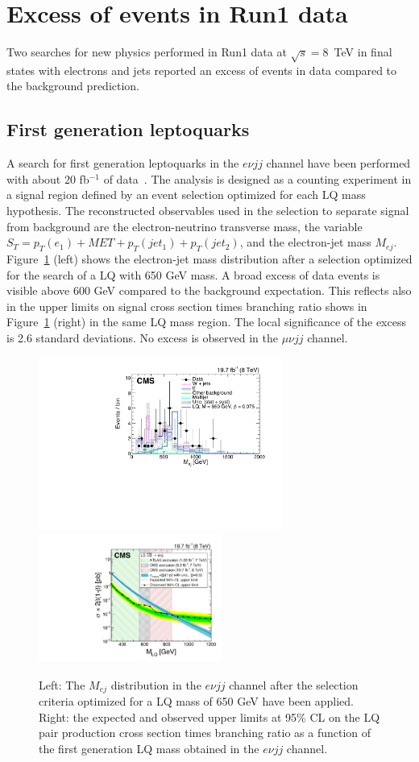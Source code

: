 \documentclass[epj]{webofc}
\begin{document}
\section{Excess of events in Run1 data}
\label{excess}

Two searches for new physics performed in Run1 data at $\sqrt{s}=8$~TeV
in final states with electrons and jets reported an excess of events
in data compared to the background prediction.

\subsection{First generation leptoquarks}

A search for first generation leptoquarks in the $e\nu jj$ channel
have been performed with about 20 fb$^{-1}$ of data~\cite{Khachatryan:2015vaa}. The analysis is
designed as a counting experiment in a signal region defined by an
event selection optimized for each LQ mass hypothesis. The
reconstructed observables used in the selection to separate signal from background
are the electron-neutrino transverse mass, the variable $S_{T}=p_T(e_1)+MET+p_T(jet_1)+p_T(jet_2)$, 
and the electron-jet mass $M_{ej}$. Figure~\ref{LQ1} (left) shows the 
electron-jet mass distribution after a selection optimized for the
search of a LQ with 650 GeV mass. A broad excess of data events is visible 
above 600 GeV compared to the background expectation. This reflects also in the
upper limits on signal cross section times branching ratio shows in
Figure~\ref{LQ1} (right) in the same LQ mass region. The local significance of
the excess is 2.6 standard deviations. No excess is observed in the
$\mu\nu jj$ channel.
%
\begin{figure}[h]
\centering
\includegraphics[width=8cm,clip]{CMS-EXO-12-041_Figure_009-b.pdf}
\includegraphics[width=6cm,clip]{CMS-EXO-12-041_Figure_010-b.pdf}
\caption{Left: The $M_{ej}$ distribution in the $e\nu jj$ channel after the
  selection criteria optimized for a LQ mass of 650 GeV have been
  applied. Right: the expected and observed upper limits at 95\% CL on
the LQ pair production cross section times branching ratio as a
function of the first generation LQ mass obtained in the $e\nu jj$ channel.}
\label{LQ1}       %
\end{figure}
\end{document}
